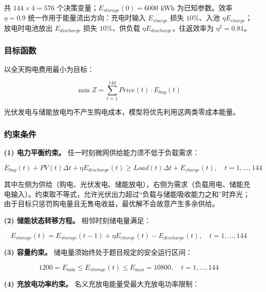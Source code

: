 \documentclass[zihao=-4,a4paper,UTF8,fontset=none]{ctexart}
\begin{document}
共 $144\times 4 = 576$ 个决策变量；$E_{storage}(0)=6000$ kWh 为已知参数。效率 $\eta=0.9$ 统一作用于能量流出方向：充电时输入 $E_{charge}$ 损失 $10\%$、入池 $\eta E_{charge}$；放电时电池放出 $E_{discharge}$ 损失 $10\%$、供负载 $\eta E_{discharge}$，往返效率为 $\eta^2=0.81$。

\subsubsection{目标函数}

以全天购电费用最小为目标：

\begin{equation}
  \min Z = \sum_{t=1}^{144} Price(t)\cdot E_{buy}(t)
  \label{eq:obj}
\end{equation}

光伏发电与储能放电均不产生购电成本，模型将优先利用这两类零成本能量。

\subsubsection{约束条件}

\textbf{(1) 电力平衡约束。} 任一时刻微网供给能力须不低于负载需求：

\begin{equation}
  E_{buy}(t) + PV(t)\Delta t + \eta E_{discharge}(t) \ge Load(t)\Delta t + E_{charge}(t),\quad t=1,\ldots,144
  \label{eq:balance}
\end{equation}

其中左侧为供给（购电、光伏发电、储能放电），右侧为需求（负载用电、储能充电输入）。约束取不等式，允许光伏出力超过“负载与储能吸收能力之和”时弃光；由于目标只惩罚购电量且无售电收益，最优解不会故意产生多余供给。

\textbf{(2) 储能状态转移方程。} 相邻时刻储电量满足：

\begin{equation}
  E_{storage}(t) = E_{storage}(t-1) + \eta E_{charge}(t) - E_{discharge}(t),\quad t=1,\ldots,144
  \label{eq:state}
\end{equation}

\textbf{(3) 容量约束。} 储电量须始终处于题目规定的安全运行区间：

\begin{equation}
  1200 = E_{\min} \le E_{storage}(t) \le E_{\max} = 10800,\quad t=1,\ldots,144
  \label{eq:capacity}
\end{equation}

\textbf{(4) 充放电功率约束。} 名义充放电能量受最大充放电功率限制：
\end{document}
